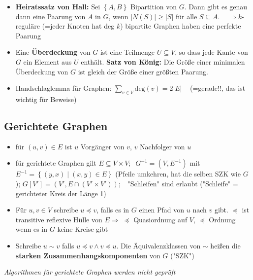 \documentclass[10pt,a4paper]{article}
\begin{document}
\begin{itemize}
\item \textbf{Heiratssatz von Hall:} Sei $\left\lbrace A,B \right\rbrace$ Bipartition von $G$. Dann gibt es genau dann eine Paarung von $A$ in $G$, wenn $\vert N(S)\vert\geq \vert S\vert$ für alle $S\subseteq A$.$\;\;\;\; \Rightarrow k$-reguläre (=jeder Knoten hat deg $k$) bipartite Graphen haben eine perfekte Paarung 
\item Eine \textbf{Überdeckung} von $G$ ist eine Teilmenge $U\subseteq V$, so dass jede Kante von $G$ ein Element aus $U$ enthält. \textbf{Satz von König:} Die Größe einer minimalen Überdeckung von $G$ ist gleich der Größe einer größten Paarung.
\item Handschlaglemma für Graphen: $\sum_{v\in V} \text{deg}(v)=2\vert E \vert\;\;\;$ (=gerade!!, das ist wichtig für Beweise)
\end{itemize}



\subsection{Gerichtete Graphen}
\begin{itemize}
\item für $(u,v)\in E$ ist $u$ Vorgänger von $v$, $v$ Nachfolger von $u$
\item für gerichtete Graphen gilt $E\subseteq V\times V;\;\;G^{-1}=(V,E^{-1})$ mit $E^{-1}=\left\lbrace (y,x)\mid (x,y)\in E\right\rbrace$ (Pfeile umkehren, hat die selben SZK wie $G$);
$G[V']=(V',E\cap (V'\times V'));\;\;$ "Schleifen" sind erlaubt ("Schleife" = gerichteter Kreis der Länge 1)
\item Für $u,v\in V$ schreibe $u\preceq v$, falls es in $G$ einen Pfad von $u$ nach $v$ gibt. $\preceq$ ist transitive reflexive Hülle von $E\Rightarrow\;\preceq $ Quasiordnung auf $V$, $\preceq$ Ordnung wenn es in $G$ keine Kreise gibt 
\item Schreibe $u \sim v$ falls $u\preceq v \land v\preceq u$. Die Äquivalenzklassen von $\sim$ heißen die \textbf{starken Zusammenhangskomponenten} von $G$ ("SZK")


\end{itemize}
\textit{Algorithmen für gerichtete Graphen werden nicht geprüft}
\end{document}
